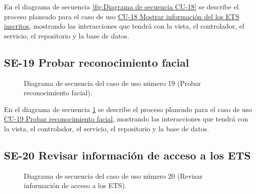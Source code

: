 En el diagrama de secuencia \ref{fig:Diagrama de secuencia CU-18} se describe el proceso planeado para el caso de uso \hyperlink{CU-18}{CU-18 Mostrar información del los ETS inscritos}, mostrando las interacciones que tendrá con la vista, el controlador, el servicio, el repositorio y la base de datos.

\newpage

\subsection{SE-19 Probar reconocimiento facial}

\begin{figure}[htbp!]
	\begin{center}
		\caption{Diagrama de secuencia del caso de uso número 19 (Probar reconocimiento facial).}
		\label{fig:Diagrama de secuencia CU-19}
	\end{center}
\end{figure}

En el diagrama de secuencia \ref{fig:Diagrama de secuencia CU-19} se describe el proceso planeado para el caso de uso \hyperlink{CU-19}{CU-19 Probar reconocimiento facial}, mostrando las interacciones que tendrá con la vista, el controlador, el servicio, el repositorio y la base de datos.

\newpage

\subsection{SE-20 Revisar información de acceso a los ETS}

\begin{figure}[htbp!]
	\begin{center}
		\caption{Diagrama de secuencia del caso de uso número 20 (Revisar información de acceso a los ETS).}
		\label{fig:Diagrama de secuencia CU-20}
	\end{center}
\end{figure}

